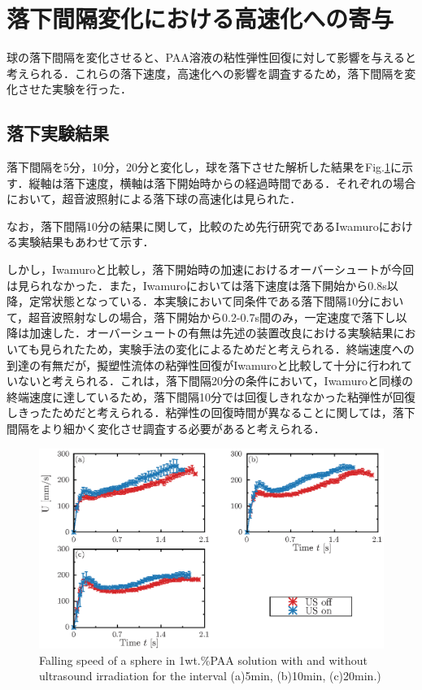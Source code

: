 \section{落下間隔変化における高速化への寄与}
球の落下間隔を変化させると、PAA溶液の粘性弾性回復に対して影響を与えると考えられる．これらの落下速度，高速化への影響を調査するため，落下間隔を変化させた実験を行った．

\subsection{落下実験結果}

落下間隔を5分，10分，20分と変化し，球を落下させた解析した結果をFig.\ref{fig:falling-interval}に示す．縦軸は落下速度，横軸は落下開始時からの経過時間である．それぞれの場合において，超音波照射による落下球の高速化は見られた．

なお，落下間隔10分の結果に関して，比較のため先行研究であるIwamuro\cite{ref:9}における実験結果もあわせて示す．

しかし，Iwamuro\cite{ref:9}と比較し，落下開始時の加速におけるオーバーシュートが今回は見られなかった．また，Iwamuro\cite{ref:9}においては落下速度は落下開始から0.8s以降，定常状態となっている．本実験において同条件である落下間隔10分において，超音波照射なしの場合，落下開始から0.2-0.7s間のみ，一定速度で落下し以降は加速した．オーバーシュートの有無は先述の装置改良における実験結果においても見られたため，実験手法の変化によるためだと考えられる．終端速度への到達の有無だが，擬塑性流体の粘弾性回復がIwamuro\cite{ref:9}と比較して十分に行われていないと考えられる．これは，落下間隔20分の条件において，Iwamuro\cite{ref:9}と同様の終端速度に達しているため，落下間隔10分では回復しきれなかった粘弾性が回復しきったためだと考えられる．粘弾性の回復時間が異なることに関しては，落下間隔をより細かく変化させ調査する必要があると考えられる．

\begin{figure}[H]
    \centering
    \includegraphics[width=1\textwidth]{./X-Appendix/interval/interval.eps}
    \caption{Falling speed of a sphere in 1wt.\%PAA solution with and without ultrasound irradiation for the interval (a)5min, (b)10min, (c)20min.)}
    \label{fig:falling-interval}
\end{figure}

